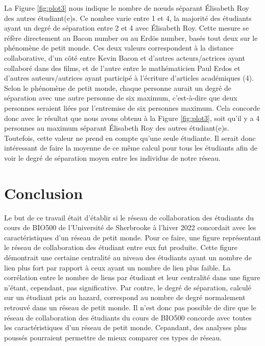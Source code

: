 \documentclass[9pt,twocolumn,twoside,]{pnas-new}
\begin{document}
La Figure \ref{fig:plot3} nous indique le nombre de nœuds séparant
Élisabeth Roy des autres étudiant(e)s. Ce nombre varie entre 1 et 4, la
majorité des étudiants ayant un degré de séparation entre 2 et 4 avec
Élisabeth Roy. Cette mesure se réfère directement au Bacon number ou au
Erdös number, basés tout deux sur le phénomène de petit monde. Ces deux
valeurs correspondent à la distance collaborative, d'un côté entre Kevin
Bacon et d'autres acteurs/actrices ayant collaboré dans des films, et de
l'autre entre le mathématicien Paul Erdos et d'autres auteurs/autrices
ayant participé à l'écriture d'articles académiques (4). Selon le
phénomène de petit monde, chaque personne aurait un degré de séparation
avec une autre personne de six maximum, c'est-à-dire que deux personnes
seraient liées par l'entremise de six personnes maximum. Cela concorde
donc avec le résultat que nous avons obtenu à la Figure \ref{fig:plot3},
soit qu'il y a 4 personnes au maximum séparant Élisabeth Roy des autres
étudiant(e)s. Toutefois, cette valeur ne prend en compte qu'une seule
étudiante. Il serait donc intéressant de faire la moyenne de ce même
calcul pour tous les étudiants afin de voir le degré de séparation moyen
entre les individus de notre réseau.

\hypertarget{conclusion}{%
\section{Conclusion}\label{conclusion}}

Le but de ce travail était d'établir si le réseau de collaboration des
étudiants du cours de BIO500 de l'Université de Sherbrooke à l'hiver
2022 concordait avec les caractéristiques d'un réseau de petit monde.
Pour ce faire, une figure représentant le réseau de collaboration des
étudiant entre eux fut produite. Cette figure démontrait une certaine
centralité au niveau des étudiants ayant un nombre de lien plus fort par
rapport à ceux ayant un nombre de lien plus faible. La corrélation entre
le nombre de liens par étudiant et leur centralité dans une figure
n'étant, cependant, pas significative. Par contre, le degré de
séparation, calculé sur un étudiant pris au hazard, correspond au nombre
de degré normalement retrouvé dans un réseau de petit monde. Il n'est
donc pas possible de dire que le réseau de collaboration des étudiants
du cours de BIO500 concorde avec toutes les caractéristiques d'un réseau
de petit monde. Cepandant, des analyses plus poussés pourraient
permettre de mieux comparer ces types de réseau.
\end{document}
